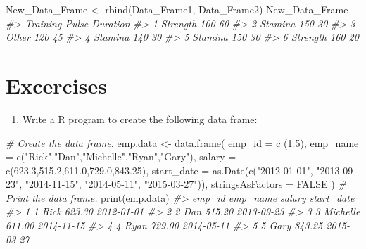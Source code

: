 \documentclass[
]{book}
\newenvironment{Shaded}{\begin{snugshade}}{\end{snugshade}}
\newcommand{\AttributeTok}[1]{\textcolor[rgb]{0.77,0.63,0.00}{#1}}
\newcommand{\CommentTok}[1]{\textcolor[rgb]{0.56,0.35,0.01}{\textit{#1}}}
\newcommand{\ConstantTok}[1]{\textcolor[rgb]{0.00,0.00,0.00}{#1}}
\newcommand{\DecValTok}[1]{\textcolor[rgb]{0.00,0.00,0.81}{#1}}
\newcommand{\FloatTok}[1]{\textcolor[rgb]{0.00,0.00,0.81}{#1}}
\newcommand{\FunctionTok}[1]{\textcolor[rgb]{0.00,0.00,0.00}{#1}}
\newcommand{\NormalTok}[1]{#1}
\newcommand{\OtherTok}[1]{\textcolor[rgb]{0.56,0.35,0.01}{#1}}
\newcommand{\SpecialCharTok}[1]{\textcolor[rgb]{0.00,0.00,0.00}{#1}}
\newcommand{\StringTok}[1]{\textcolor[rgb]{0.31,0.60,0.02}{#1}}
\providecommand{\tightlist}{%
  \setlength{\itemsep}{0pt}\setlength{\parskip}{0pt}}
\begin{document}
\begin{Shaded}
\begin{Highlighting}[]
\NormalTok{New\_Data\_Frame }\OtherTok{\textless{}{-}} \FunctionTok{rbind}\NormalTok{(Data\_Frame1, Data\_Frame2)}
\NormalTok{New\_Data\_Frame}
\CommentTok{\#\textgreater{}   Training Pulse Duration}
\CommentTok{\#\textgreater{} 1 Strength   100       60}
\CommentTok{\#\textgreater{} 2  Stamina   150       30}
\CommentTok{\#\textgreater{} 3    Other   120       45}
\CommentTok{\#\textgreater{} 4  Stamina   140       30}
\CommentTok{\#\textgreater{} 5  Stamina   150       30}
\CommentTok{\#\textgreater{} 6 Strength   160       20}
\end{Highlighting}
\end{Shaded}

\hypertarget{excercises}{%
\section{Excercises}\label{excercises}}

\begin{enumerate}
\def\labelenumi{\arabic{enumi}.}
\tightlist
\item
  Write a R program to create the following data frame:
\end{enumerate}

\begin{Shaded}
\begin{Highlighting}[]
\CommentTok{\# Create the data frame.}
\NormalTok{emp.data }\OtherTok{\textless{}{-}} \FunctionTok{data.frame}\NormalTok{(}
   \AttributeTok{emp\_id =} \FunctionTok{c}\NormalTok{ (}\DecValTok{1}\SpecialCharTok{:}\DecValTok{5}\NormalTok{), }
   \AttributeTok{emp\_name =} \FunctionTok{c}\NormalTok{(}\StringTok{"Rick"}\NormalTok{,}\StringTok{"Dan"}\NormalTok{,}\StringTok{"Michelle"}\NormalTok{,}\StringTok{"Ryan"}\NormalTok{,}\StringTok{"Gary"}\NormalTok{),}
   \AttributeTok{salary =} \FunctionTok{c}\NormalTok{(}\FloatTok{623.3}\NormalTok{,}\FloatTok{515.2}\NormalTok{,}\FloatTok{611.0}\NormalTok{,}\FloatTok{729.0}\NormalTok{,}\FloatTok{843.25}\NormalTok{), }
      \AttributeTok{start\_date =} \FunctionTok{as.Date}\NormalTok{(}\FunctionTok{c}\NormalTok{(}\StringTok{"2012{-}01{-}01"}\NormalTok{, }\StringTok{"2013{-}09{-}23"}\NormalTok{, }\StringTok{"2014{-}11{-}15"}\NormalTok{, }\StringTok{"2014{-}05{-}11"}\NormalTok{,}
      \StringTok{"2015{-}03{-}27"}\NormalTok{)),}
   \AttributeTok{stringsAsFactors =} \ConstantTok{FALSE}
\NormalTok{)}
\CommentTok{\# Print the data frame.         }
\FunctionTok{print}\NormalTok{(emp.data) }
\CommentTok{\#\textgreater{}   emp\_id emp\_name salary start\_date}
\CommentTok{\#\textgreater{} 1      1     Rick 623.30 2012{-}01{-}01}
\CommentTok{\#\textgreater{} 2      2      Dan 515.20 2013{-}09{-}23}
\CommentTok{\#\textgreater{} 3      3 Michelle 611.00 2014{-}11{-}15}
\CommentTok{\#\textgreater{} 4      4     Ryan 729.00 2014{-}05{-}11}
\CommentTok{\#\textgreater{} 5      5     Gary 843.25 2015{-}03{-}27}
\end{Highlighting}
\end{Shaded}
\end{document}
